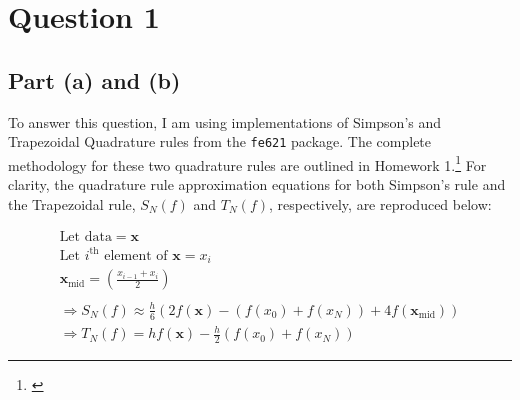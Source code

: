 \documentclass[10pt]{article}
\begin{document}
\newpage



\section{Question 1}


\subsection{Part (a) and (b)}

To answer this question, I am using implementations of Simpson's and Trapezoidal Quadrature rules from the \texttt{fe621} package. The complete methodology for these two quadrature rules are outlined in Homework 1.\footnote{\cite{Weerawarana2019}} For clarity, the quadrature rule approximation equations for both Simpson's rule and the Trapezoidal rule, $S_N(f)$ and $T_N(f)$, respectively, are reproduced below:

\begin{gather*}
    \text{Let data} = \boldsymbol{x} \\
    \text{Let $i^\text{th}$ element of $\boldsymbol{x}$} = x_i \\
    \boldsymbol{x}_\text{mid} = \left( \frac{x_{i - 1} + x_i}{2} \right) \\
    \\
    \Rightarrow S_N(f) \approx \frac{h}{6} (2f(\boldsymbol{x}) - (f(x_0) + f(x_N)) + 4f(\boldsymbol{x}_\text{mid})) \\
    \Rightarrow T_N(f) = hf(\boldsymbol{x}) - \frac{h}{2} (f(x_0) + f(x_N))
\end{gather*}
\end{document}

